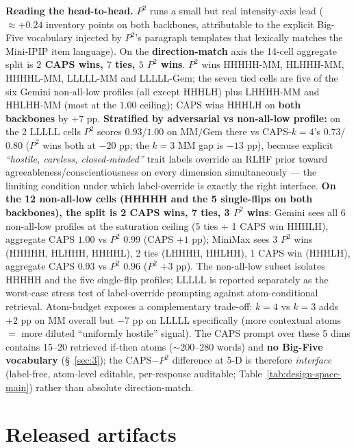 \textbf{Reading the head-to-head.} $P^{\!2}$ runs a small but real intensity-axis lead ($\approx +0.24$ inventory points on both backbones, attributable to the explicit Big-Five vocabulary injected by $P^{\!2}$'s paragraph templates that lexically matches the Mini-IPIP item language). On the \textbf{direction-match} axis the 14-cell aggregate split is \textbf{$2$ CAPS wins, $7$ ties, $5$ $P^{\!2}$ wins}. $P^{\!2}$ wins HHHHH-MM, HLHHH-MM, HHHHL-MM, LLLLL-MM and LLLLL-Gem; the seven tied cells are five of the six Gemini non-all-low profiles (all except HHHLH) plus LHHHH-MM and HHLHH-MM (most at the $1.00$ ceiling); CAPS wins HHHLH on \textbf{both backbones} by $+7$ pp. \textbf{Stratified by adversarial vs non-all-low profile:} on the 2 LLLLL cells $P^{\!2}$ scores $0.93$/$1.00$ on MM/Gem there vs CAPS-$k{=}4$'s $0.73$/$0.80$ ($P^{\!2}$ wins both at $-20$ pp; the $k{=}3$ MM gap is $-13$ pp), because explicit \textit{``hostile, careless, closed-minded''} trait labels override an RLHF prior toward agreeableness/conscientiousness on every dimension simultaneously --- the limiting condition under which label-override is exactly the right interface. \textbf{On the 12 non-all-low cells (HHHHH and the 5 single-flips on both backbones), the split is 2 CAPS wins, 7 ties, 3 $P^{\!2}$ wins}: Gemini sees all 6 non-all-low profiles at the saturation ceiling (5 ties + 1 CAPS win HHHLH), aggregate CAPS $1.00$ vs $P^{\!2}$ $0.99$ (CAPS $+1$ pp); MiniMax sees 3 $P^{\!2}$ wins (HHHHH, HLHHH, HHHHL), 2 ties (LHHHH, HHLHH), 1 CAPS win (HHHLH), aggregate CAPS $0.93$ vs $P^{\!2}$ $0.96$ ($P^{\!2}$ $+3$ pp). The non-all-low subset isolates HHHHH and the five single-flip profiles; LLLLL is reported separately as the worst-case stress test of label-override prompting against atom-conditional retrieval. Atom-budget exposes a complementary trade-off: $k{=}4$ vs $k{=}3$ adds $+2$ pp on MM overall but $-7$ pp on LLLLL specifically (more contextual atoms $=$ more diluted ``uniformly hostile'' signal). The CAPS prompt over these 5 dims contains 15--20 retrieved if-then atoms ($\sim 200$--$280$ words) and \textbf{no Big-Five vocabulary} (\S~\ref{sec:3}); the CAPS$-$$P^{\!2}$ difference at 5-D is therefore \textit{interface} (label-free, atom-level editable, per-response auditable; Table~\ref{tab:design-space-main}) rather than absolute direction-match.

\section{Released artifacts}
\label{app:D}

